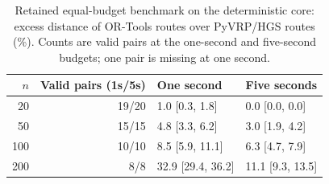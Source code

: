 \begin{table}[H]
\centering
\small
\caption{Retained equal-budget benchmark on the deterministic core: excess distance of OR-Tools routes over PyVRP/HGS routes (\%). Counts are valid pairs at the one-second and five-second budgets; one pair is missing at one second.}
\label{tab:hgs}
\begin{tabular}{rrll}
\toprule
$n$ & Valid pairs (1s/5s) & One second & Five seconds\\
\midrule
20 & 19/20 & 1.0 [0.3, 1.8] & 0.0 [0.0, 0.0]\\
50 & 15/15 & 4.8 [3.3, 6.2] & 3.0 [1.9, 4.2]\\
100 & 10/10 & 8.5 [5.9, 11.1] & 6.3 [4.7, 7.9]\\
200 & 8/8 & 32.9 [29.4, 36.2] & 11.1 [9.3, 13.5]\\
\bottomrule
\end{tabular}
\end{table}
